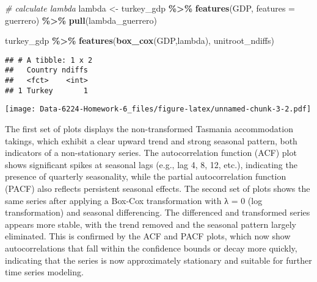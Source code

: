 \documentclass[
]{article}
\newenvironment{Shaded}{\begin{snugshade}}{\end{snugshade}}
\newcommand{\AttributeTok}[1]{\textcolor[rgb]{0.13,0.29,0.53}{#1}}
\newcommand{\CommentTok}[1]{\textcolor[rgb]{0.56,0.35,0.01}{\textit{#1}}}
\newcommand{\DecValTok}[1]{\textcolor[rgb]{0.00,0.00,0.81}{#1}}
\newcommand{\FunctionTok}[1]{\textcolor[rgb]{0.13,0.29,0.53}{\textbf{#1}}}
\newcommand{\NormalTok}[1]{#1}
\newcommand{\OtherTok}[1]{\textcolor[rgb]{0.56,0.35,0.01}{#1}}
\newcommand{\SpecialCharTok}[1]{\textcolor[rgb]{0.81,0.36,0.00}{\textbf{#1}}}
\newcommand{\StringTok}[1]{\textcolor[rgb]{0.31,0.60,0.02}{#1}}
\begin{document}
\begin{Shaded}
\begin{Highlighting}[]
\CommentTok{\# calculate lambda}
\NormalTok{lambda }\OtherTok{\textless{}{-}}\NormalTok{ turkey\_gdp }\SpecialCharTok{\%\textgreater{}\%}
  \FunctionTok{features}\NormalTok{(GDP, }\AttributeTok{features =}\NormalTok{ guerrero) }\SpecialCharTok{\%\textgreater{}\%}
  \FunctionTok{pull}\NormalTok{(lambda\_guerrero)}


\NormalTok{turkey\_gdp }\SpecialCharTok{\%\textgreater{}\%}
  \FunctionTok{features}\NormalTok{(}\FunctionTok{box\_cox}\NormalTok{(GDP,lambda), unitroot\_ndiffs) }
\end{Highlighting}
\end{Shaded}

\begin{verbatim}
## # A tibble: 1 x 2
##   Country ndiffs
##   <fct>    <int>
## 1 Turkey       1
\end{verbatim}

\begin{Shaded}
\end{Shaded}

\texttt{[image: Data-6224-Homework-6\_files/figure-latex/unnamed-chunk-3-2.pdf]}

The first set of plots displays the non-transformed Tasmania
accommodation takings, which exhibit a clear upward trend and strong
seasonal pattern, both indicators of a non-stationary series. The
autocorrelation function (ACF) plot shows significant spikes at seasonal
lags (e.g., lag 4, 8, 12, etc.), indicating the presence of quarterly
seasonality, while the partial autocorrelation function (PACF) also
reflects persistent seasonal effects. The second set of plots shows the
same series after applying a Box-Cox transformation with λ = 0 (log
transformation) and seasonal differencing. The differenced and
transformed series appears more stable, with the trend removed and the
seasonal pattern largely eliminated. This is confirmed by the ACF and
PACF plots, which now show autocorrelations that fall within the
confidence bounds or decay more quickly, indicating that the series is
now approximately stationary and suitable for further time series
modeling.
\end{document}
